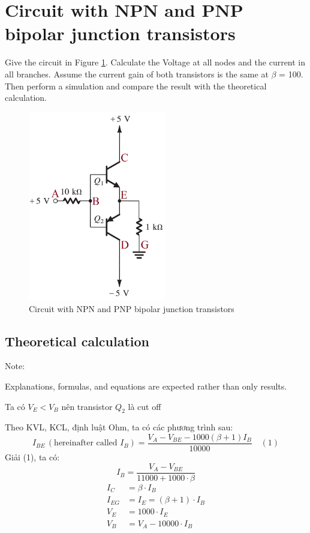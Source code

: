 \section{Circuit with NPN and PNP bipolar junction transistors}
Give the circuit in Figure \ref{lab3_ex7_de}. Calculate the Voltage at all nodes and the current in all branches.
Assume the current gain of both transistors is the same at $\beta$ = 100. Then perform a simulation and compare the result with the theoretical calculation.

\begin{figure}[h]
    \centering
    \includegraphics[width=6cm]{graphics/ex7/lab3_ex7_de.png}
    \caption{Circuit with NPN and PNP bipolar junction transistors}
    \label{lab3_ex7_de}
\end{figure}

\subsection{Theoretical calculation}
Note:

Explanations, formulas, and equations are expected rather than only results.

Ta có $V_E < V_B$ nên transistor $Q_2$ là cut off

Theo KVL, KCL, định luật Ohm, ta có các phương trình sau:
\[
I_{BE} \, (\text{hereinafter called } I_B) = \frac{V_A - V_{BE} - 1000 (\beta +1)I_B}{10000} \quad (1)
\]
Giải (1), ta có:
\[
I_B = \frac{V_A - V_{BE}}{11000 + 1000 \cdot \beta}
\]
\begin{align*}
    I_C &= \beta \cdot I_B\\
    I_{EG} &= I_E = (\beta + 1) \cdot I_B\\
    V_E &= 1000 \cdot I_E\\
    V_B &= V_A - 10000 \cdot I_B\\    
\end{align*}

